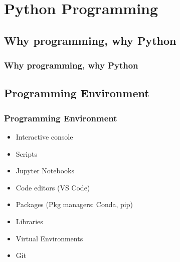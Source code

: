 



\begin{frame}
   \titlepage
\end{frame}



\begin{frame}
   \tableofcontents
\end{frame}

\section{Python Programming}


\subsection{Why programming, why Python}
\begin{frame}\frametitle{Why programming, why Python}

\end{frame}



\subsection{Programming Environment}
\begin{frame}\frametitle{Programming Environment}

      \begin{itemize}
         \item<1-> Interactive console
         \item<2-> Scripts
         \item<3-> Jupyter Notebooks
         \item<4-> Code editors (VS Code)
         \item<5-> Packages (Pkg managers: Conda, pip)
         \item<6-> Libraries
         \item<6-> Virtual Environments
         \item<7-> Git
      \end{itemize}

\end{frame}
